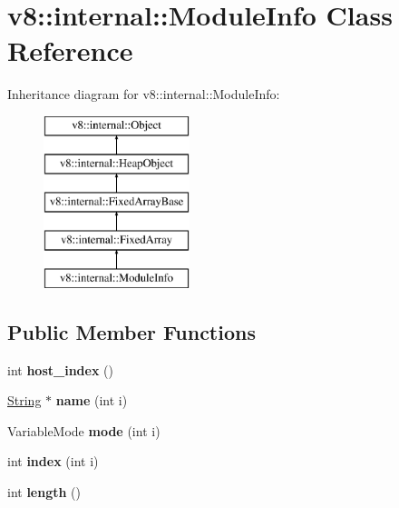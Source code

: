 \hypertarget{classv8_1_1internal_1_1_module_info}{}\section{v8\+:\+:internal\+:\+:Module\+Info Class Reference}
\label{classv8_1_1internal_1_1_module_info}
Inheritance diagram for v8\+:\+:internal\+:\+:Module\+Info\+:\begin{figure}[H]
\begin{center}
\leavevmode
\includegraphics[height=5.000000cm]{classv8_1_1internal_1_1_module_info}
\end{center}
\end{figure}
\subsection*{Public Member Functions}
\begin{DoxyCompactItemize}
\item 
\hypertarget{classv8_1_1internal_1_1_module_info_ada43ca59c5dc2ac2f2d7a805a70f03f4}{}int {\bfseries host\+\_\+index} ()\label{classv8_1_1internal_1_1_module_info_ada43ca59c5dc2ac2f2d7a805a70f03f4}

\item 
\hypertarget{classv8_1_1internal_1_1_module_info_a829580890fe27d4d2a44573b12208818}{}\hyperlink{classv8_1_1internal_1_1_string}{String} $\ast$ {\bfseries name} (int i)\label{classv8_1_1internal_1_1_module_info_a829580890fe27d4d2a44573b12208818}

\item 
\hypertarget{classv8_1_1internal_1_1_module_info_a2e61a7fffb0c58459ea532c6874755b2}{}Variable\+Mode {\bfseries mode} (int i)\label{classv8_1_1internal_1_1_module_info_a2e61a7fffb0c58459ea532c6874755b2}

\item 
\hypertarget{classv8_1_1internal_1_1_module_info_a8e813fd220f17c75e75d64ac236b92d6}{}int {\bfseries index} (int i)\label{classv8_1_1internal_1_1_module_info_a8e813fd220f17c75e75d64ac236b92d6}

\item 
\hypertarget{classv8_1_1internal_1_1_module_info_af99fe341ccd935813fd5f669c6ff2b3e}{}int {\bfseries length} ()\label{classv8_1_1internal_1_1_module_info_af99fe341ccd935813fd5f669c6ff2b3e}

\end{DoxyCompactItemize}
